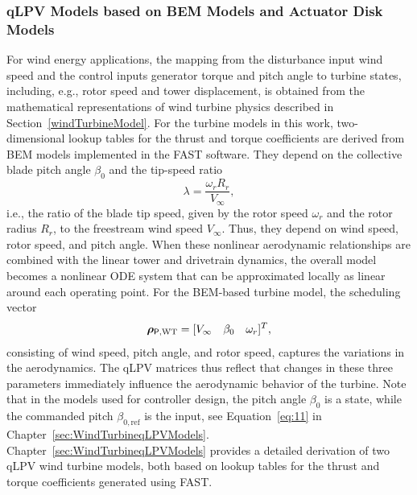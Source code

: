 \subsubsection{qLPV Models based on BEM Models and Actuator Disk Models}
\label{sec:quasi-LPVTurbineModel}

For wind energy applications, the mapping from the disturbance input wind speed and the control inputs generator torque and pitch angle to turbine states, including, e.g., rotor speed and tower displacement, is obtained from the mathematical representations of wind turbine physics described in Section~\ref{windTurbineModel}. For the turbine models in this work, two-dimensional lookup tables for the thrust and torque coefficients are derived from BEM models implemented in the FAST software. They depend on the collective blade pitch angle $\beta_0$ and the tip-speed ratio
\begin{equation} \label{eq:lambda}
    \lambda = \frac{\omega_r R_r}{V_\infty},
\end{equation}
i.e., the ratio of the blade tip speed, given by the rotor speed $\omega_r$ and the rotor radius $R_r$, to the freestream wind speed $V_\infty$. Thus, they depend on wind speed, rotor speed, and pitch angle. When these nonlinear aerodynamic relationships are combined with the linear tower and drivetrain dynamics, the overall model becomes a nonlinear ODE system that can be approximated locally as linear around each operating point. For the BEM-based turbine model, the scheduling vector
\begin{equation} \label{eq:rhoWT}
    \bm{\rho}_{\mathsf{P},\text{WT}} = [V_\infty \quad \beta_0 \quad \omega_r]^T,
\end{equation}
consisting of wind speed, pitch angle, and rotor speed, captures the variations in the aerodynamics. The qLPV matrices thus reflect that changes in these three parameters immediately influence the aerodynamic behavior of the turbine. Note that in the models used for controller design, the pitch angle $\beta_0$ is a state, while the commanded pitch $\beta_{0,\text{ref}}$ is the input, see Equation~\eqref{eq:11} in Chapter~\ref{sec:WindTurbineqLPVModels}. Chapter~\ref{sec:WindTurbineqLPVModels} provides a detailed derivation of two qLPV wind turbine models, both based on lookup tables for the thrust and torque coefficients generated using FAST.

